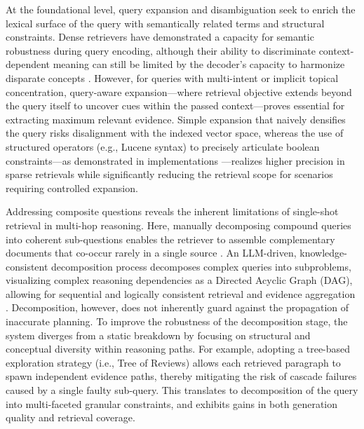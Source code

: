 \documentclass[11pt,a4paper]{article}
\begin{document}
At the foundational level, query expansion and disambiguation seek to enrich the lexical surface of the query with semantically related terms and structural constraints. Dense retrievers have demonstrated a capacity for semantic robustness during query encoding, although their ability to discriminate context-dependent meaning can still be limited by the decoder's capacity to harmonize disparate concepts \cite{arxiv:2607.21333v1}. However, for queries with multi-intent or implicit topical concentration, query-aware expansion---where retrieval objective extends beyond the query itself to uncover cues within the passed context---proves essential for extracting maximum relevant evidence. Simple expansion that naively densifies the query risks disalignment with the indexed vector space, whereas the use of structured operators (e.g., Lucene syntax) to precisely articulate boolean constraints---as demonstrated in implementations \cite{arxiv:2502.18139v1}---realizes higher precision in sparse retrievals while significantly reducing the retrieval scope for scenarios requiring controlled expansion.

Addressing composite questions reveals the inherent limitations of single-shot retrieval in multi-hop reasoning. Here, manually decomposing compound queries into coherent sub-questions enables the retriever to assemble complementary documents that co-occur rarely in a single source \cite{arxiv:2507.00355v1}. An LLM-driven, knowledge-consistent decomposition process decomposes complex queries into subproblems, visualizing complex reasoning dependencies as a Directed Acyclic Graph (DAG), allowing for sequential and logically consistent retrieval and evidence aggregation \cite{arxiv:2508.06105v2}. Decomposition, however, does not inherently guard against the propagation of inaccurate planning. To improve the robustness of the decomposition stage, the system diverges from a static breakdown by focusing on structural and conceptual diversity within reasoning paths. For example, adopting a tree-based exploration strategy (i.e., Tree of Reviews) \cite{arxiv:2404.14464v1} allows each retrieved paragraph to spawn independent evidence paths, thereby mitigating the risk of cascade failures caused by a single faulty sub-query. This translates to decomposition of the query into multi-faceted granular constraints, and exhibits gains in both generation quality and retrieval coverage.
\end{document}

